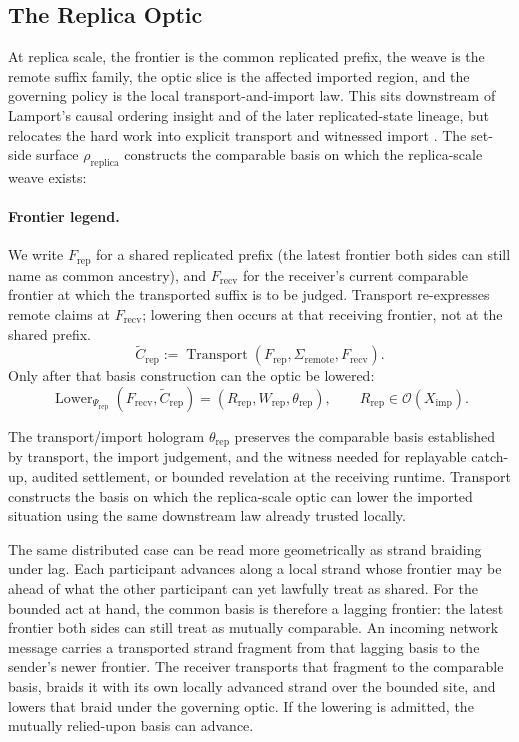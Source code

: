 \documentclass{aion}
\begin{document}
\subsection{The Replica Optic}

At replica scale, the frontier is the common replicated prefix, the
weave is the remote suffix family, the optic slice is the affected
imported region, and the governing policy is the local transport-and-import
law. This sits downstream of Lamport's causal ordering insight and of the later
replicated-state lineage, but relocates the hard work into explicit transport
and witnessed import \cite{Lamport1978,DeCandia2007,Shapiro2011}. The set-side
surface \(\rho_{\mathrm{replica}}\) constructs the comparable basis on which
the replica-scale weave exists:

\paragraph{Frontier legend.}
We write \(F_{\mathrm{rep}}\) for a shared replicated prefix (the latest
frontier both sides can still name as common ancestry), and \(F_{\mathrm{recv}}\)
for the receiver's current comparable frontier at which the transported suffix
is to be judged. Transport re-expresses remote claims at \(F_{\mathrm{recv}}\);
lowering then occurs at that receiving frontier, not at the shared prefix.
\[
	\widetilde{C}_{\mathrm{rep}}
	:=
	\operatorname{Transport}(F_{\mathrm{rep}}, \Sigma_{\mathrm{remote}}, F_{\mathrm{recv}}).
\]
Only after that basis construction can the optic be lowered:
\[
	\operatorname{Lower}_{\Psi_{\mathrm{rep}}}(F_{\mathrm{recv}}, \widetilde{C}_{\mathrm{rep}})
	=
	(R_{\mathrm{rep}}, W_{\mathrm{rep}}, \theta_{\mathrm{rep}}),
	\qquad
	R_{\mathrm{rep}} \in \mathcal{O}(X_{\mathrm{imp}}).
\]

	The transport/import hologram \(\theta_{\mathrm{rep}}\) preserves the
	comparable basis established by transport, the import judgement, and the
	witness needed for replayable catch-up, audited settlement, or bounded
	revelation at the receiving runtime. Transport constructs the basis on which
	the replica-scale optic can lower the imported situation using the same
	downstream law already trusted locally.

The same distributed case can be read more geometrically as strand braiding
under lag. Each participant advances along a local strand whose frontier may be
ahead of what the other participant can yet lawfully treat as shared. For the
	bounded act at hand, the common basis is therefore a lagging frontier: the
	latest frontier both sides can still treat as mutually comparable. An incoming
	network message carries a transported strand fragment from that lagging basis
	to the sender's newer frontier. The receiver transports
	that fragment to the comparable basis, braids it with its own locally advanced
	strand over the bounded site, and lowers that braid under the governing optic.
	If the lowering is admitted, the mutually relied-upon basis can advance.
\end{document}
